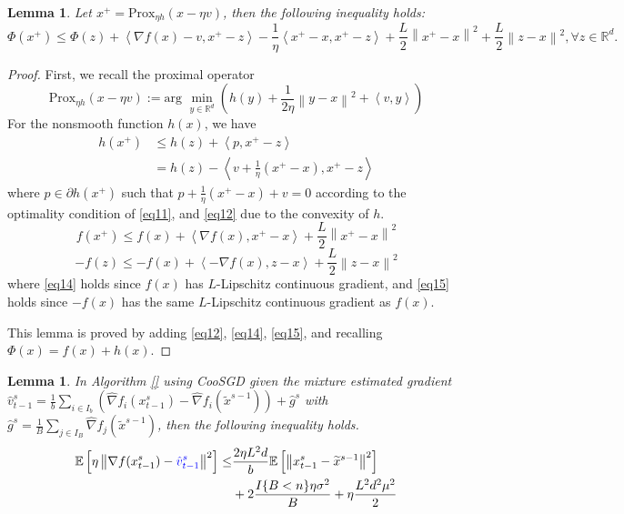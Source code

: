 \documentclass{article}
\newcommand*{\R}{\mathbb{R}}
\newcommand*{\Po}{\text{Prox}}
\newcommand*{\E}{\mathbb{E}}
\newcommand{\norm}[1]{\left\lVert#1\right\rVert}
\newcommand{\Iprod}[2]{\left\langle #1,#2\right\rangle}
\newtheorem{lemma}[theorem]{Lemma}
\theoremstyle{definition}
\theoremstyle{remark}
\begin{document}
\begin{lemma}\label{lemma1}
Let $x^+ = \Po_{\eta h}(x-\eta v)$, then the following inequality holds:
\begin{equation}\label{eq10}
\Phi(x^+) \leq \Phi(z) + \Iprod{\nabla f(x)-v}{x^+-z}-\frac{1}{\eta} \Iprod{x^+-x}{x^+-z}+\frac{L}{2}\norm{x^+-x}^2+\frac{L}{2}\norm{z-x}^2, \forall z\in \R^d. 
\end{equation}
\end{lemma}
\begin{proof}
First, we recall the proximal operator 
\begin{equation}\label{eq11}
\Po_{\eta h}(x-\eta v) := \text{arg}\,\,\min_{y\in\R^d}\left(h(y)+\frac{1}{2\eta}\norm{y-x}^2+\Iprod{v}{y}\right)
\end{equation}
For the nonsmooth function $h(x)$, we have 
\begin{equation}\label{eq12}
\begin{split}
h(x^+) &\leq h(z) + \Iprod{p}{x^+-z}\\
&= h(z) - \Iprod{v+\frac{1}{\eta}(x^+-x)}{x^+-z}
\end{split}
\end{equation}
where $p\in \partial h(x^+)$ such that $p+\frac{1}{\eta}(x^+-x)+v = 0$ according to the optimality condition of \eqref{eq11}, and \eqref{eq12} due to the convexity of $h$.
\begin{equation}\label{eq14}
f(x^+) \leq f(x)+\Iprod{\nabla f(x)}{x^+-x}+\frac{L}{2}\norm{x^+-x}^2
\end{equation}
\begin{equation}\label{eq15}
-f(z) \leq -f(x)+\Iprod{-\nabla f(x)}{z-x}+\frac{L}{2}\norm{z-x}^2
\end{equation}
where \eqref{eq14} holds since $f(x)$ has $L$-Lipschitz continuous gradient, and \eqref{eq15} holds since $-f(x)$ has the same $L$-Lipschitz continuous gradient as $f(x)$. 

 This lemma is proved by adding \eqref{eq12}, \eqref{eq14}, \eqref{eq15}, and recalling $\Phi(x) = f(x)+h(x)$. 
\end{proof}
\begin{lemma}
In Algorithm \ref{} using CooSGD given the mixture estimated gradient $\hat{v}_{t-1}^s = \frac{1}{b} \sum_{i\in I_b}\left(\hat{\nabla} f_{i}(x_{t-1}^s)-\hat{\nabla} f_{i}(\tilde{x}^{s-1})\right)+\hat{g}^s$ with $\hat{g}^s = \frac{1}{B} \sum_{j\in I_B} \hat{\nabla} f_j (\widetilde{x}^{s-1})$, then the following inequality holds. 
\begin{equation}
\begin{split}
\E\left[\eta\norm{\nabla f(x_{t-1}^s)-{\color{blue}\hat{v}_{t-1}^s}}^2\right] \leq&  \frac{2\eta L^2 d}{b}\E\left[\norm{x_{t-1}^s-\widetilde{x}^{s-1}}^2\right]\\
&+ 2\frac{I\{B < n\}\eta \sigma ^2}{B}+\eta \frac{L^2 d^2 \mu^2}{2}
\end{split}
\end{equation}
\end{lemma}
\end{document}
